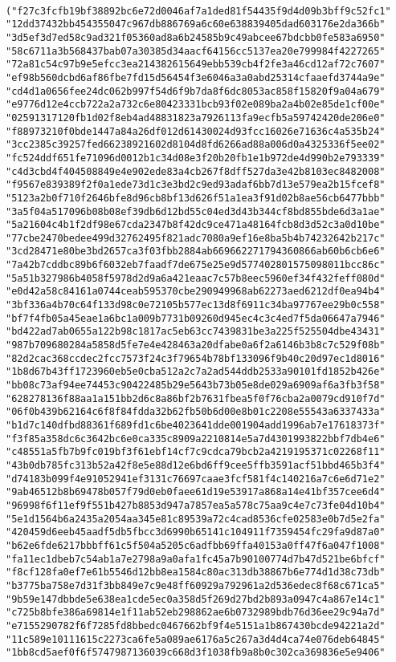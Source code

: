 \documentclass[11pt]{article}
\begin{document}
\begin{verbatim}
       ("f27c3fcfb19bf38892bc6e72d0046af7a1ded81f54435f9d4d09b3bff9c52fc1" "12dd37432bb454355047c967db886769a6c60e638839405dad603176e2da366b" "3d5ef3d7ed58c9ad321f05360ad8a6b24585b9c49abcee67bdcbb0fe583a6950" "58c6711a3b568437bab07a30385d34aacf64156cc5137ea20e799984f4227265" "72a81c54c97b9e5efcc3ea214382615649ebb539cb4f2fe3a46cd12af72c7607" "ef98b560dcbd6af86fbe7fd15d56454f3e6046a3a0abd25314cfaaefd3744a9e" "cd4d1a0656fee24dc062b997f54d6f9b7da8f6dc8053ac858f15820f9a04a679" "e9776d12e4ccb722a2a732c6e80423331bcb93f02e089ba2a4b02e85de1cf00e" "02591317120fb1d02f8eb4ad48831823a7926113fa9ecfb5a59742420de206e0" "f88973210f0bde1447a84a26df012d61430024d93fcc16026e71636c4a535b24" "3cc2385c39257fed66238921602d8104d8fd6266ad88a006d0a4325336f5ee02" "fc524ddf651fe71096d0012b1c34d08e3f20b20fb1e1b972de4d990b2e793339" "c4d3cbd4f404508849e4e902ede83a4cb267f8dff527da3e42b8103ec8482008" "f9567e839389f2f0a1ede73d1c3e3bd2c9ed93adaf6bb7d13e579ea2b15fcef8" "5123a2b0f710f2646bfe8d96cb8bf13d626f51a1ea3f91d02b8ae56cb6477bbb" "3a5f04a517096b08b08ef39db6d12bd55c04ed3d43b344cf8bd855bde6d3a1ae" "5a21604c4b1f2df98e67cda2347b8f42dc9ce471a48164fcb8d3d52c3a0d10be" "77cbe2470bedee499d32762495f821adc7080a9ef16e8ba5b4b74232642b217c" "3cd28471e80be3bd2657ca3f03fbb2884ab669662271794360866ab60b6cb6e6" "7a42b7cddbc89b6f6032eb7faadf7de675e25e9d577402801575098011bcc86c" "5a51b327986b4058f5978d2d9a6a421eaac7c57b8eec5960ef34f432feff080d" "e0d42a58c84161a0744ceab595370cbe290949968ab62273aed6212df0ea94b4" "3bf336a4b70c64f133d98c0e72105b577ec13d8f6911c34ba97767ee29b0c558" "bf7f4fb05a45eae1a6bc1a009b7731b09260d945ec4c3c4ed7f5da06647a7946" "bd422ad7ab0655a122b98c1817ac5eb63cc7439831be3a225f525504dbe43431" "987b709680284a5858d5fe7e4e428463a20dfabe0a6f2a6146b3b8c7c529f08b" "82d2cac368ccdec2fcc7573f24c3f79654b78bf133096f9b40c20d97ec1d8016" "1b8d67b43ff1723960eb5e0cba512a2c7a2ad544ddb2533a90101fd1852b426e" "bb08c73af94ee74453c90422485b29e5643b73b05e8de029a6909af6a3fb3f58" "628278136f88aa1a151bb2d6c8a86bf2b7631fbea5f0f76cba2a0079cd910f7d" "06f0b439b62164c6f8f84fdda32b62fb50b6d00e8b01c2208e55543a6337433a" "b1d7c140dfbd88361f689fd1c6be4023641dde001904add1996ab7e17618373f" "f3f85a358dc6c3642bc6e0ca335c8909a2210814e5a7d4301993822bbf7db4e6" "c48551a5fb7b9fc019bf3f61ebf14cf7c9cdca79bcb2a4219195371c02268f11" "43b0db785fc313b52a42f8e5e88d12e6bd6ff9cee5ffb3591acf51bbd465b3f4" "d74183b099f4e91052941ef3131c76697caae3fcf581f4c140216a7c6e6d71e2" "9ab46512b8b69478b057f79d0eb0faee61d19e53917a868a14e41bf357cee6d4" "96998f6f11ef9f551b427b8853d947a7857ea5a578c75aa9c4e7c73fe04d10b4" "5e1d1564b6a2435a2054aa345e81c89539a72c4cad8536cfe02583e0b7d5e2fa" "420459d6eeb45aadf5db5fbcc3d6990b65141c104911f7359454fc29fa9d87a0" "b62e6fde6217bbbff61c5f504a5205c6adfbb69ffa40153a0ff47f6a047f1008" "fa11ec1dbeb7c54ab1a7e2798a9a0afa1fc45a7b90100774d7b47d521be6bfcf" "f8cf128fa0ef7e61b5546d12bb8ea1584c80ac313db38867b6e774d1d38c73db" "b3775ba758e7d31f3bb849e7c9e48ff60929a792961a2d536edec8f68c671ca5" "9b59e147dbbde5e638ea1cde5ec0a358d5f269d27bd2b893a0947c4a867e14c1" "c725b8bfe386a69814e1f11ab52eb298862ae6b0732989bdb76d36ee29c94a7d" "e7155290782f6f7285fd8bbedc0467662bf9f4e5151a1b867430bcde94221a2d" "11c589e10111615c2273ca6fe5a089ae6176a5c267a3d4d4ca74e076deb64845" "1bb8cd5aef0f6f5747987136039c668d3f1038fb9a8b0c302ca369836e5e9406" 
\end{verbatim}
\end{document}
